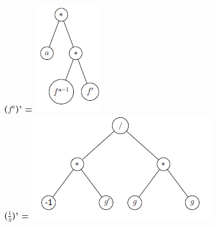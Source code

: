 \documentclass[10pt,a4paper]{article}
\begin{document}
\textbf{($f^{a}$)' =} \includegraphics[scale=1]{q9-fa.png}\\
\textbf{($\frac{1}{g}$)' =} \includegraphics[scale=1]{q9-1divg.png} 
\end{document}

